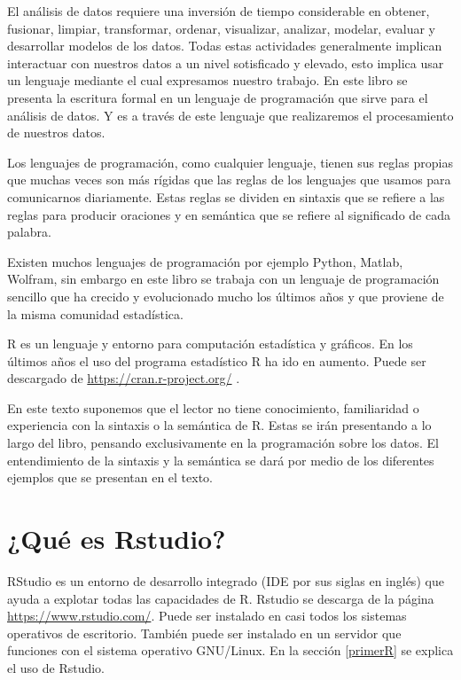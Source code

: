 \documentclass[letterpaper,]{book}
\begin{document}
El análisis de datos requiere una inversión de tiempo considerable en obtener, fusionar, limpiar, transformar, ordenar, visualizar, analizar, modelar, evaluar y desarrollar modelos de los datos. Todas estas actividades generalmente implican interactuar con nuestros datos a un nivel sotisficado y elevado, esto implica usar un lenguaje mediante el cual expresamos nuestro trabajo. En este libro se presenta la escritura formal en un lenguaje de programación que sirve para el análisis de datos. Y es a través de este lenguaje que realizaremos el procesamiento de nuestros datos.

Los lenguajes de programación, como cualquier lenguaje, tienen sus reglas propias que muchas veces son más rígidas que las reglas de los lenguajes que usamos para comunicarnos diariamente. Estas reglas se dividen en sintaxis que se refiere a las reglas para producir oraciones y en semántica que se refiere al significado de cada palabra.

Existen muchos lenguajes de programación por ejemplo Python, Matlab, Wolfram, sin embargo en este libro se trabaja con un lenguaje de programación sencillo que ha crecido y evolucionado mucho los últimos años y que proviene de la misma comunidad estadística.

R es un lenguaje y entorno para computación estadística y gráficos. En los últimos años el uso del programa estadístico R ha ido en aumento. Puede ser descargado de \url{https://cran.r-project.org/} \citep{R-base}.

En este texto suponemos que el lector no tiene conocimiento, familiaridad o experiencia con la sintaxis o la semántica de R. Estas se irán presentando a lo largo del libro, pensando exclusivamente en la programación sobre los datos. El entendimiento de la sintaxis y la semántica se dará por medio de los diferentes ejemplos que se presentan en el texto.

\hypertarget{que-es-rstudio}{%
\section{¿Qué es Rstudio?}\label{que-es-rstudio}}

RStudio es un entorno de desarrollo integrado (IDE por sus siglas en inglés) que ayuda a explotar todas las capacidades de R. Rstudio se descarga de la página \url{https://www.rstudio.com/}. Puede ser instalado en casi todos los sistemas operativos de escritorio. También puede ser instalado en un servidor que funciones con el sistema operativo GNU/Linux. En la sección \ref{primerR} se explica el uso de Rstudio.
\end{document}
